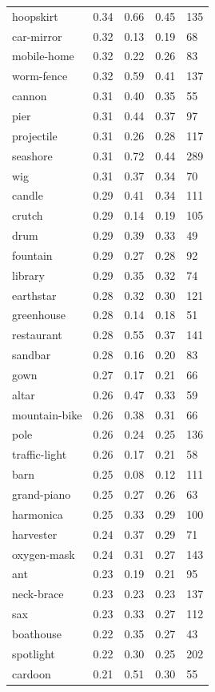 \begin{center}
\begin{longtable}{lllll}
hoopskirt & 0.34 & 0.66 & 0.45 & 135 \\
car-mirror & 0.32 & 0.13 & 0.19 & 68 \\
mobile-home & 0.32 & 0.22 & 0.26 & 83 \\
worm-fence & 0.32 & 0.59 & 0.41 & 137 \\
cannon & 0.31 & 0.40 & 0.35 & 55 \\
pier & 0.31 & 0.44 & 0.37 & 97 \\
projectile & 0.31 & 0.26 & 0.28 & 117 \\
seashore & 0.31 & 0.72 & 0.44 & 289 \\
wig & 0.31 & 0.37 & 0.34 & 70 \\
candle & 0.29 & 0.41 & 0.34 & 111 \\
crutch & 0.29 & 0.14 & 0.19 & 105 \\
drum & 0.29 & 0.39 & 0.33 & 49 \\
fountain & 0.29 & 0.27 & 0.28 & 92 \\
library & 0.29 & 0.35 & 0.32 & 74 \\
earthstar & 0.28 & 0.32 & 0.30 & 121 \\
greenhouse & 0.28 & 0.14 & 0.18 & 51 \\
restaurant & 0.28 & 0.55 & 0.37 & 141 \\
sandbar & 0.28 & 0.16 & 0.20 & 83 \\
gown & 0.27 & 0.17 & 0.21 & 66 \\
altar & 0.26 & 0.47 & 0.33 & 59 \\
mountain-bike & 0.26 & 0.38 & 0.31 & 66 \\
pole & 0.26 & 0.24 & 0.25 & 136 \\
traffic-light & 0.26 & 0.17 & 0.21 & 58 \\
barn & 0.25 & 0.08 & 0.12 & 111 \\
grand-piano & 0.25 & 0.27 & 0.26 & 63 \\
harmonica & 0.25 & 0.33 & 0.29 & 100 \\
harvester & 0.24 & 0.37 & 0.29 & 71 \\
oxygen-mask & 0.24 & 0.31 & 0.27 & 143 \\
ant & 0.23 & 0.19 & 0.21 & 95 \\
neck-brace & 0.23 & 0.23 & 0.23 & 137 \\
sax & 0.23 & 0.33 & 0.27 & 112 \\
boathouse & 0.22 & 0.35 & 0.27 & 43 \\
spotlight & 0.22 & 0.30 & 0.25 & 202 \\
cardoon & 0.21 & 0.51 & 0.30 & 55 \\

\end{longtable}
\end{center}
